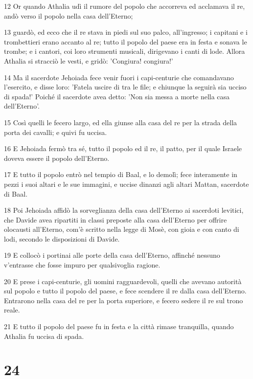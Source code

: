 \par 12 Or quando Athalia udì il rumore del popolo che accorreva ed acclamava il re, andò verso il popolo nella casa dell'Eterno;
\par 13 guardò, ed ecco che il re stava in piedi sul suo palco, all'ingresso; i capitani e i trombettieri erano accanto al re; tutto il popolo del paese era in festa e sonava le trombe; e i cantori, coi loro strumenti musicali, dirigevano i canti di lode. Allora Athalia si stracciò le vesti, e gridò: 'Congiura! congiura!'
\par 14 Ma il sacerdote Jehoiada fece venir fuori i capi-centurie che comandavano l'esercito, e disse loro: 'Fatela uscire di tra le file; e chiunque la seguirà sia ucciso di spada!' Poiché il sacerdote avea detto: 'Non sia messa a morte nella casa dell'Eterno'.
\par 15 Così quelli le fecero largo, ed ella giunse alla casa del re per la strada della porta dei cavalli; e quivi fu uccisa.
\par 16 E Jehoiada fermò tra sé, tutto il popolo ed il re, il patto, per il quale Israele doveva essere il popolo dell'Eterno.
\par 17 E tutto il popolo entrò nel tempio di Baal, e lo demolì; fece interamente in pezzi i suoi altari e le sue immagini, e uccise dinanzi agli altari Mattan, sacerdote di Baal.
\par 18 Poi Jehoiada affidò la sorveglianza della casa dell'Eterno ai sacerdoti levitici, che Davide avea ripartiti in classi preposte alla casa dell'Eterno per offrire olocausti all'Eterno, com'è scritto nella legge di Mosè, con gioia e con canto di lodi, secondo le disposizioni di Davide.
\par 19 E collocò i portinai alle porte della casa dell'Eterno, affinché nessuno v'entrasse che fosse impuro per qualsivoglia ragione.
\par 20 E prese i capi-centurie, gli uomini ragguardevoli, quelli che avevano autorità sul popolo e tutto il popolo del paese, e fece scendere il re dalla casa dell'Eterno. Entrarono nella casa del re per la porta superiore, e fecero sedere il re sul trono reale.
\par 21 E tutto il popolo del paese fu in festa e la città rimase tranquilla, quando Athalia fu uccisa di spada.

\chapter{24}

